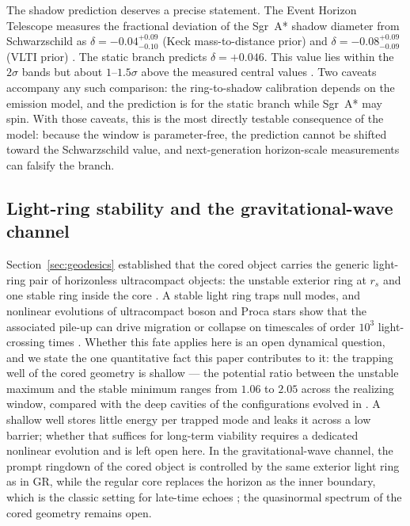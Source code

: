 \documentclass[12pt,a4paper]{article}
\begin{document}
The shadow prediction deserves a precise statement. The Event Horizon
Telescope measures the fractional deviation of the Sgr~A* shadow diameter
from Schwarzschild as $\delta=-0.04^{+0.09}_{-0.10}$ (Keck mass-to-distance
prior) and $\delta=-0.08^{+0.09}_{-0.09}$ (VLTI prior) \cite{EHT2022SgrA}.
The static branch predicts $\delta=+0.046$. This value lies within the
$2\sigma$ bands but about $1$--$1.5\sigma$ above the measured central values
\cite{Vagnozzi2023}. Two caveats accompany any such comparison: the
ring-to-shadow calibration depends on the emission model, and the
prediction is for the static branch while Sgr~A* may spin. With those
caveats, this is the most directly testable consequence of the model: because
the window is parameter-free, the prediction cannot be shifted toward the
Schwarzschild value, and next-generation horizon-scale measurements can
falsify the branch.

\subsection{Light-ring stability and the gravitational-wave channel}
\label{sec:lightring}

Section~\ref{sec:geodesics} established that the cored object carries the
generic light-ring pair of horizonless ultracompact objects: the unstable
exterior ring at $r_s$ and one stable ring inside the core
\cite{CunhaBertiHerdeiro2017}. A stable light ring traps null modes, and
nonlinear evolutions of ultracompact boson and Proca stars show that the
associated pile-up can drive migration or collapse on timescales of order
$10^3$ light-crossing times \cite{CunhaEtAl2023}. Whether this fate applies
here is an open dynamical question, and we state the one quantitative fact
this paper contributes to it: the trapping well of the cored geometry is
shallow --- the potential ratio between the unstable maximum and the stable
minimum ranges from $1.06$ to $2.05$ across the realizing window, compared
with the deep cavities of the configurations evolved in
\cite{CunhaEtAl2023}. A shallow well stores little energy per trapped mode
and leaks it across a low barrier; whether that suffices for long-term
viability requires a dedicated nonlinear evolution and is left open here. In the gravitational-wave channel, the prompt ringdown of the cored
object is controlled by the same exterior light ring as in GR, while the
regular core replaces the horizon as the inner boundary, which is the
classic setting for late-time echoes \cite{Cardoso2016,AbediEtAl2017,
WesterweckEtAl2018}; the quasinormal spectrum of the cored geometry remains
open.
\end{document}
